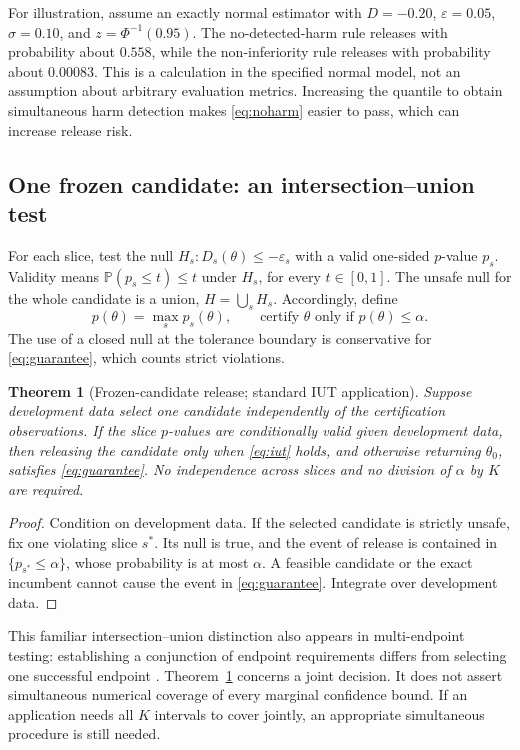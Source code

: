 \documentclass[11pt,letterpaper]{article}
\newtheorem{theorem}{Theorem}
\newcommand{\Prb}{\mathbb{P}}
\newcommand{\old}{\theta_0}
\newcommand{\eps}{\varepsilon}
\begin{document}
For illustration, assume an exactly normal estimator with $D=-0.20$, $\eps=0.05$, $\sigma=0.10$, and $z=\Phi^{-1}(0.95)$. The no-detected-harm rule releases with probability about $0.558$, while the non-inferiority rule releases with probability about $0.00083$. This is a calculation in the specified normal model, not an assumption about arbitrary evaluation metrics. Increasing the quantile to obtain simultaneous harm detection makes \eqref{eq:noharm} easier to pass, which can increase release risk.

\subsection{One frozen candidate: an intersection--union test}
For each slice, test the null $H_s:D_s(\theta)\leq-\eps_s$ with a valid one-sided $p$-value $p_s$. Validity means $\Prb(p_s\leq t)\leq t$ under $H_s$, for every $t\in[0,1]$. The unsafe null for the whole candidate is a union, $H=\bigcup_s H_s$. Accordingly, define
\begin{equation}
p(\theta)=\max_s p_s(\theta),\qquad
\text{certify }\theta\text{ only if }p(\theta)\leq\alpha.
\label{eq:iut}
\end{equation}
The use of a closed null at the tolerance boundary is conservative for \eqref{eq:guarantee}, which counts strict violations.

\begin{theorem}[Frozen-candidate release; standard IUT application]
\label{thm:one}
Suppose development data select one candidate independently of the certification observations. If the slice $p$-values are conditionally valid given development data, then releasing the candidate only when \eqref{eq:iut} holds, and otherwise returning $\old$, satisfies \eqref{eq:guarantee}. No independence across slices and no division of $\alpha$ by $K$ are required.
\end{theorem}
\begin{proof}
Condition on development data. If the selected candidate is strictly unsafe, fix one violating slice $s^*$. Its null is true, and the event of release is contained in $\{p_{s^*}\leq\alpha\}$, whose probability is at most $\alpha$. A feasible candidate or the exact incumbent cannot cause the event in \eqref{eq:guarantee}. Integrate over development data.
\end{proof}

This familiar intersection--union distinction also appears in multi-endpoint testing: establishing a conjunction of endpoint requirements differs from selecting one successful endpoint \citep{fda2022}. Theorem~\ref{thm:one} concerns a joint decision. It does not assert simultaneous numerical coverage of every marginal confidence bound. If an application needs all $K$ intervals to cover jointly, an appropriate simultaneous procedure is still needed.
\end{document}
